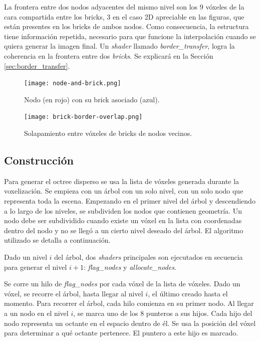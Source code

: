 La frontera entre dos nodos adyacentes del mismo nivel son los 9 vóxeles de la cara compartida entre los bricks, 3 en el caso 2D apreciable en las figuras, que están presentes en los bricks de ambos nodos. 
Como consecuencia, la estructura tiene información repetida, necesario para que funcione la interpolación cuando se quiera generar la imagen final.
Un \textit{shader} llamado \textit{border\_transfer}, logra la coherencia en la frontera entre dos \textit{bricks}.
Se explicará en la Sección \ref{sec:border_transfer}.

\begin{figure}[h!]
    \centering
    \texttt{[image: node-and-brick.png]}
    \caption{Nodo (en rojo) con su brick asociado (azul).}
    \label{fig:node_and_brick}
\end{figure}

\begin{figure}[h!]
    \centering
    \texttt{[image: brick-border-overlap.png]}
    \caption{Solapamiento entre vóxeles de bricks de nodos vecinos.}
    \label{fig:brick_border_overlap}
\end{figure}

\subsection{Construcción}\label{design:svo_construction}

Para generar el octree disperso se usa la lista de vóxeles generada durante la voxelización.
Se empieza con un árbol con un solo nivel, con un solo nodo que representa toda la escena.
Empezando en el primer nivel del árbol y descendiendo a lo largo de los niveles, se subdividen los nodos que contienen geometría.
Un nodo debe ser subdividido cuando existe un vóxel en la lista con coordenadas dentro del nodo y no se llegó a un cierto nivel deseado del árbol.
El algoritmo utilizado se detalla a continuación.

Dado un nivel $i$ del árbol, dos \textit{shaders} principales son ejecutados en secuencia para generar el nivel $i + 1$: \textit{flag\_nodes} y \textit{allocate\_nodes}.

Se corre un hilo de \textit{flag\_nodes} por cada vóxel de la lista de vóxeles.
Dado un vóxel, se recorre el árbol, hasta llegar al nivel $i$, el último creado hasta el momento.
Para recorrer el árbol, cada hilo comienza en su primer nodo.
Al llegar a un nodo en el nivel $i$, se marca uno de los $8$ punteros a sus hijos.
Cada hijo del nodo representa un octante en el espacio dentro de él.
Se usa la posición del vóxel para determinar a qué octante pertenece.
El puntero a este hijo es marcado.

